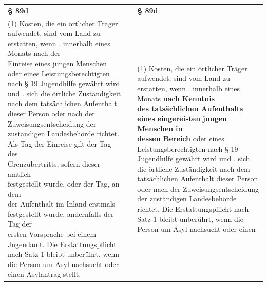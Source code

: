 \documentclass[10pt,a4paper,landscape]{article}
\begin{document}
\begin{longtable}{|L{8.2cm}|L{8.2cm}|L{8.2cm}|}
\hhline{|---|}
\textbf{\S{} 89d} &  & \textbf{\S{} 89d} \\
\hhline{|---|}
(1) Kosten, die ein örtlicher Träger  \newline aufwendet, sind vom Land zu erstatten,  \newline wenn   .  innerhalb eines Monats nach \textcolor{diffred}{der  \newline Einreise} eines jungen Menschen oder  \newline eines Leistungsberechtigten nach \S{} 19  \newline Jugendhilfe gewährt wird und   . sich die örtliche Zuständigkeit nach dem  \newline tatsächlichen Aufenthalt dieser Person  \newline oder nach der Zuweisungsentscheidung  \newline der zuständigen Landesbehörde richtet.   \newline \textcolor{diffred}{Als Tag der Einreise gilt der Tag des  \newline Grenzübertritts, sofern dieser amtlich  \newline festgestellt wurde, oder der Tag, an dem  \newline der Aufenthalt im Inland erstmals  \newline festgestellt wurde, andernfalls der Tag der  \newline ersten Vorsprache bei einem Jugendamt.}  \newline Die Erstattungspflicht nach Satz 1 bleibt  \newline unberührt, wenn die Person um Asyl  \newline nachsucht oder einen Asylantrag stellt. &  & (1) Kosten, die ein örtlicher Träger  \newline aufwendet, sind vom Land zu erstatten,  \newline wenn   .  innerhalb eines Monats \textbf{nach }\textbf{\textcolor{diffgreen}{Kenntnis  \newline des tatsächlichen Aufenthalts}}\textbf{ eines} \newline \textbf{\textcolor{diffgreen}{eingereisten}}\textbf{ jungen Menschen }\textbf{\textcolor{diffgreen}{in  \newline dessen Bereich}} oder eines  \newline Leistungsberechtigten nach \S{} 19  \newline Jugendhilfe gewährt wird und   . sich die örtliche Zuständigkeit nach dem  \newline tatsächlichen Aufenthalt dieser Person  \newline oder nach der Zuweisungsentscheidung  \newline der zuständigen Landesbehörde richtet.   \newline Die Erstattungspflicht nach Satz 1 bleibt  \newline unberührt, wenn die Person um Asyl  \newline nachsucht oder einen 
\end{longtable}
\end{document}
